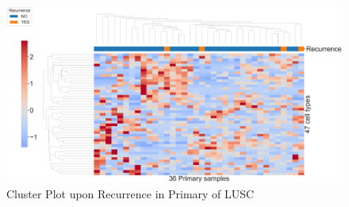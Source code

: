 \documentclass{beamer}
\begin{document}
\begin{frame}[allowframebreaks]
        \begin{figure}
            \includegraphics[width=0.9 \linewidth]{figures/BisqueRNA/clustermap/STAR.FPKM.GSE131907.SQC.Recurrence/Primary.pdf}
            \caption{Cluster Plot upon Recurrence in Primary of LUSC}
        \end{figure}
    \end{frame}
\end{document}
